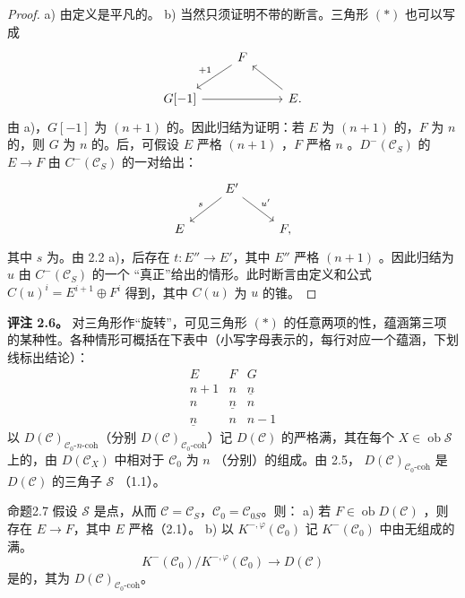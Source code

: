 \begin{proof}
a) 由定义是平凡的。
b) 当然只须证明不带的断言。三角形 $(*)$ 也可以写成
\[\begin{tikzcd}&F\arrow[dl,"+1"']&\\G[-1]\arrow[rr]&&E\arrow[ul].\end{tikzcd}\]
由 a)，$G[-1]$ 为 $(n+1)$ 的。因此归结为证明：若 $E$ 为 $(n+1)$ 的，$F$ 为 $n$ 的，则 $G$ 为 $n$ 的。后，可假设 $E$ 严格 $(n+1)$ ，$F$ 严格 $n$ 。$D^-(\mathscr C_S)$ 的 $E\to F$ 由 $C^-(\mathscr C_S)$ 的一对给出：
\[\begin{tikzcd}&E'\arrow[dl,"s"']\arrow[dr,"u'"]&\\E&&F,\end{tikzcd}\]
其中 $s$ 为。由 2.2 a)，后存在 $t:E''\to E'$，其中 $E''$ 严格 $(n+1)$ 。因此归结为 $u$ 由 $C^-(\mathscr C_S)$ 的一个
“真正”给出的情形。此时断言由定义和公式 $C(u)^i=E^{i+1}\oplus F^i$ 得到，其中 $C(u)$ 为 $u$ 的锥。
\end{proof}
\textbf{评注 2.6。} 对三角形作“旋转”，可见三角形 $(*)$ 的任意两项的性，蕴涵第三项的某种性。各种情形可概括在下表中（小写字母表示的，每行对应一个蕴涵，下划线标出结论）：
\[\begin{array}{ccc}E&F&G\\n+1&n&\underline n\\n&\underline n&n\\\underline n&n&n-1\end{array}\]
以 $D(\mathscr C)_{\mathscr C_0\text{-}n\text{-coh}}$（分别 $D(\mathscr C)_{\mathscr C_0\text{-coh}}$）记 $D(\mathscr C)$ 的严格满，其在每个 $X\in\operatorname{ob}\mathscr S$ 上的，由 $D(\mathscr C_X)$ 中相对于 $\mathscr C_0$ 为 $n$ （分别）的组成。由 2.5， $D(\mathscr C)_{\mathscr C_0\text{-coh}}$ 是 $D(\mathscr C)$ 的三角子 $\mathscr S$ （1.1）。
\begin{SGAresult}{命题}{2.7}
假设 $\mathscr S$ 是点，从而 $\mathscr C=\mathscr C_S$，$\mathscr C_0=\mathscr C_{0S}$。则：
a) 若 $F\in\operatorname{ob}D(\mathscr C)$ ，则存在 $E\to F$，其中 $E$ 严格（2.1）。
b) 以 $K^{-,\varphi}(\mathscr C_0)$ 记 $K^-(\mathscr C_0)$ 中由无组成的满。
\[K^-(\mathscr C_0)/K^{-,\varphi}(\mathscr C_0)\longrightarrow D(\mathscr C)\]
是的，其为 $D(\mathscr C)_{\mathscr C_0\text{-coh}}$。
\end{SGAresult}
